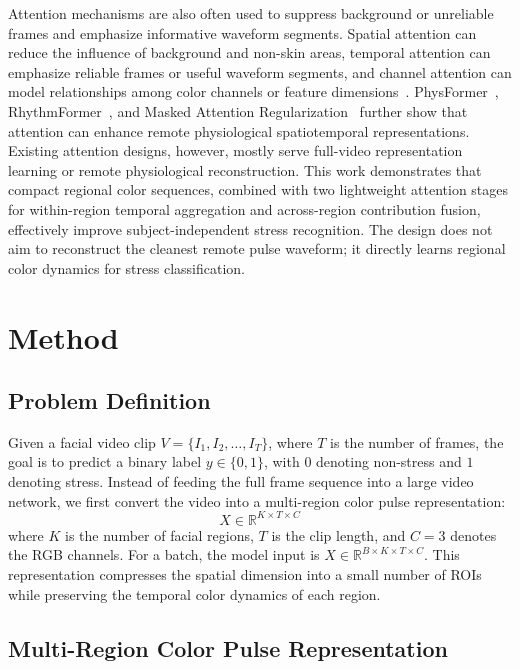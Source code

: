 \documentclass[runningheads]{llncs}
\begin{document}
Attention mechanisms are also often used to suppress background or unreliable frames and emphasize informative waveform segments. Spatial attention can reduce the influence of background and non-skin areas, temporal attention can emphasize reliable frames or useful waveform segments, and channel attention can model relationships among color channels or feature dimensions~\cite{chen2018deepphys,liu2020mttscan,xu2024mtasr}. PhysFormer~\cite{yu2022physformer}, RhythmFormer~\cite{zou2025rhythmformer}, and Masked Attention Regularization~\cite{zhao2024mar} further show that attention can enhance remote physiological spatiotemporal representations. Existing attention designs, however, mostly serve full-video representation learning or remote physiological reconstruction. This work demonstrates that compact regional color sequences, combined with two lightweight attention stages for within-region temporal aggregation and across-region contribution fusion, effectively improve subject-independent stress recognition. The design does not aim to reconstruct the cleanest remote pulse waveform; it directly learns regional color dynamics for stress classification.

\section{Method}

\subsection{Problem Definition}

Given a facial video clip $V=\{I_1,I_2,\ldots,I_T\}$, where $T$ is the number of frames, the goal is to predict a binary label $y \in \{0,1\}$, with $0$ denoting non-stress and $1$ denoting stress. Instead of feeding the full frame sequence into a large video network, we first convert the video into a multi-region color pulse representation:
\begin{equation}
    X \in \mathbb{R}^{K \times T \times C}
\end{equation}
where $K$ is the number of facial regions, $T$ is the clip length, and $C=3$ denotes the RGB channels. For a batch, the model input is $X \in \mathbb{R}^{B \times K \times T \times C}$. This representation compresses the spatial dimension into a small number of ROIs while preserving the temporal color dynamics of each region.

\subsection{Multi-Region Color Pulse Representation}
\end{document}
